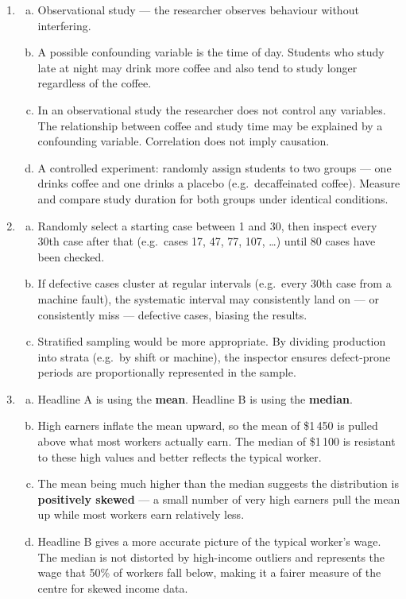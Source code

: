 \documentclass{article}
\begin{document}
\begin{enumerate}
  \item
  \begin{enumerate}[(a)]
    \item Observational study --- the researcher observes behaviour without interfering.
    \item A possible confounding variable is the time of day. Students who study late at night
    may drink more coffee and also tend to study longer regardless of the coffee.
    \item In an observational study the researcher does not control any variables. The
    relationship between coffee and study time may be explained by a confounding variable.
    Correlation does not imply causation.
    \item A controlled experiment: randomly assign students to two groups --- one drinks
    coffee and one drinks a placebo (e.g.\ decaffeinated coffee). Measure and compare study
    duration for both groups under identical conditions.
  \end{enumerate}

  \item
  \begin{enumerate}[(a)]
    \[
      \text{Sampling interval} = \frac{2\,400}{80} = 30
    \]
    \item Randomly select a starting case between 1 and 30, then inspect every 30th case
    after that (e.g.\ cases 17, 47, 77, 107, \ldots) until 80 cases have been checked.
    \item If defective cases cluster at regular intervals (e.g.\ every 30th case from a
    machine fault), the systematic interval may consistently land on --- or consistently
    miss --- defective cases, biasing the results.
    \item Stratified sampling would be more appropriate. By dividing production into strata
    (e.g.\ by shift or machine), the inspector ensures defect-prone periods are
    proportionally represented in the sample.
  \end{enumerate}

  \item
  \begin{enumerate}[(a)]
    \item Headline A is using the \textbf{mean}. Headline B is using the \textbf{median}.
    \item High earners inflate the mean upward, so the mean of \$1\,450 is pulled above what
    most workers actually earn. The median of \$1\,100 is resistant to these high values and
    better reflects the typical worker.
    \item The mean being much higher than the median suggests the distribution is
    \textbf{positively skewed} --- a small number of very high earners pull the mean up while
    most workers earn relatively less.
    \item Headline B gives a more accurate picture of the typical worker's wage. The median
    is not distorted by high-income outliers and represents the wage that 50\% of workers
    fall below, making it a fairer measure of the centre for skewed income data.
  \end{enumerate}


\end{enumerate}
\end{document}
